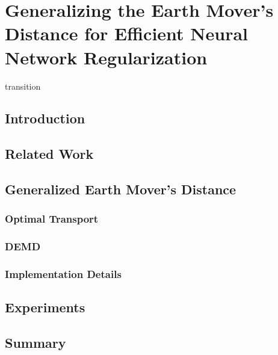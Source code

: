 \chapter{Generalizing the Earth Mover's Distance for Efficient Neural Network Regularization} \label{chap:demd}

transition

\section{Introduction}

\section{Related Work}

\section{Generalized Earth Mover's Distance}

\subsection{Optimal Transport}

\subsection{DEMD}

\subsection{Implementation Details}

\section{Experiments}

\section{Summary}